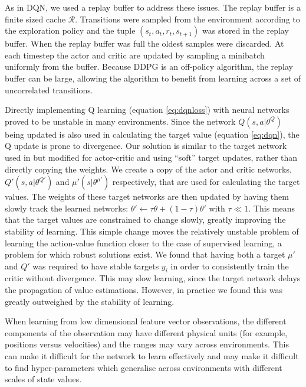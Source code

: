 \documentclass{article} %
\begin{document}
As in DQN, we used a replay buffer to address
these issues. The replay buffer is a finite sized cache $\mathcal{R}$.
Transitions were sampled
from the environment according to the exploration policy and the tuple
$(s_t, a_t, r_t, s_{t + 1})$ was stored in the replay buffer.
When the replay buffer was full the oldest samples were discarded.
At each timestep the actor and critic are updated by sampling a minibatch
uniformly from the buffer. Because DDPG is an off-policy algorithm, the
replay buffer can be large, allowing the algorithm to benefit from
learning across a set of uncorrelated transitions.

Directly implementing Q learning (equation \ref{eq:dqnloss}) with neural
networks proved to be unstable in many environments. Since the network
$Q(s, a | \theta^Q)$ being updated is also used in calculating the target value
(equation \ref{eq:dqn}),
the Q update is prone to divergence.
Our solution is similar to the
target network used in \citep{mnih2013playing} but modified for actor-critic
and using ``soft'' target updates, rather than directly copying the
weights. We
create a copy of the actor and critic networks, $Q'(s, a | \theta^{Q'})$
and $\mu'(s | \theta^{\mu'})$ respectively, that are used for calculating
the target values.
The weights of these target networks
are then updated by having them slowly track the learned networks:
$\theta' \leftarrow \tau\theta + (1 - \tau) \theta'$ with $\tau \ll 1$.
This means that the
target values are constrained to change slowly, greatly improving the
stability of learning. This simple
change moves the relatively unstable problem of
learning the action-value function closer to the case of
supervised learning,
a problem for which robust solutions exist.
We found that having both a target $\mu'$ and $Q'$ was required
to have stable targets $y_i$ in order to consistently
train the critic without divergence.
This may slow learning,
since the target network delays the propagation of value estimations. However,
in practice we found this was greatly outweighed by the stability of learning.

When learning from low dimensional feature vector observations, the different
components of the observation may have different physical units (for
example, positions versus velocities) and the ranges may vary
across environments. This can make it difficult for
the network to learn effectively and may make it difficult to find
hyper-parameters which generalise across environments with different
scales of state values.
\end{document}
